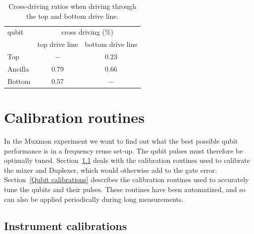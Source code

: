       \vspace{2cm}
      \begin{table}[h]
        \begin{tabular}{l c c}
          \toprule
          qubit & \multicolumn{2}{c}{cross driving (\%)} \\
          \cmidrule(lr){2-3}
               & top drive line & bottom drive line \\
          \midrule
          Top     & $-$    & $0.23$ \\
          Ancilla & $0.79$ & $0.66$ \\
          Bottom  & $0.57$ & $-$    \\
          \bottomrule
        \end{tabular}
        \caption{Cross-driving ratios when driving through the top and bottom drive line.}
        \label{tab:cross-driving}
      \end{table}

  \chapter{Calibration routines}
    \label{ch:Calibration routines}
    In the Muxmon experiment we want to find out what the best possible qubit performance is in a frequency reuse set-up. The qubit pulses must therefore be optimally tuned. Section~\ref{Instrument calibrations} deals with the calibration routines used to calibrate the mixer and Duplexer, which would otherwise add to the gate error. Section~\ref{Qubit calibrations} describes the calibration routines used to accurately tune the qubits and their pulses. These routines have been automatized, and so can also be applied periodically during long measurements.

    \section{Instrument calibrations}
      \label{Instrument calibrations}

